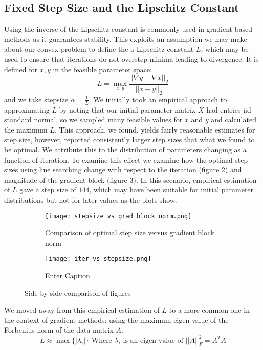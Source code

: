 \documentclass{article}
\begin{document}
\subsection{Fixed Step Size and the Lipschitz Constant}
Using the inverse of the Lipschitz constant is commonly used in gradient based methods as it guarantees stability. This exploits an assumption we may make about our convex problem to define the a Lipschitz constant $L$, which may be used to ensure that iterations do not overstep minima leading to divergence. It is defined for $x,y$ in the feasible parameter space:
$$L = \max_{x,y} \frac{||\nabla y - \nabla x||_2}{||x - y||_2}$$
and we take stepsize $\alpha=\frac{1}{L}$.
We initially took an empirical approach to approximating $L$ by noting that our initial parameter matrix $X$ had entries iid standard normal, so we sampled many feasible values for $x$ and $y$ and calculated the maximum $L$. This approach, we found, yields fairly reasonable estimates for step size, however, reported consistently larger step sizes that what we found to be optimal. We attribute this to the distribution of parameters changing as a function of iteration. To examine this effect we examine how the optimal step sizes using line searching change with respect to the iteration (figure 2) and magnitude of the gradient block (figure 3). In this scenario, empirical estimation of $L$ gave a step size of $144$, which may have been suitable for initial parameter distributions but not for later values as the plots show.
\begin{figure}[H]
    \centering
    \begin{subfigure}[b]{0.45\linewidth}  %
        \centering
        \texttt{[image: stepsize\_vs\_grad\_block\_norm.png]}
        \caption{Comparison of optimal step size versus gradient block norm}
        \label{fig:stepsize_block}
    \end{subfigure}
    \hfill
    \begin{subfigure}[b]{0.45\linewidth}  %
        \centering
        \texttt{[image: iter\_vs\_stepsize.png]}
        \caption{Enter Caption}
        \label{fig:enter-label}
    \end{subfigure}
    \caption{Side-by-side comparison of figures}
    \label{fig:side_by_side}
\end{figure}
We moved away from this empirical estimation of $L$ to a more common one in the context of gradient methods: using the maximum eigen-value of the Forbenius-norm of the data matrix $A$.
$$L\approx\max\{|\lambda_i|\} \text{ Where } \lambda_i \text{ is an eigen-value of }||A||_F^2 = A^TA$$
\end{document}
